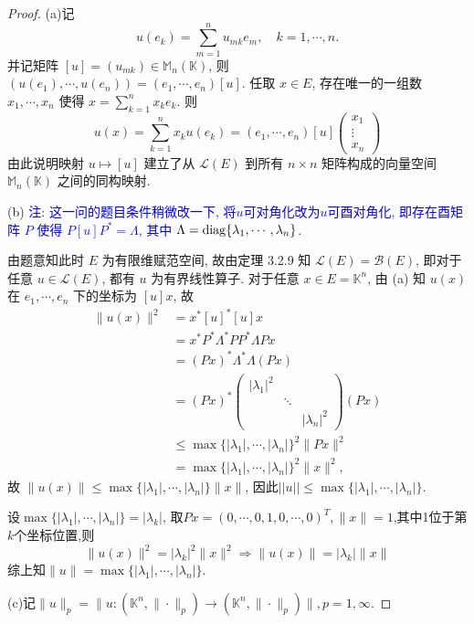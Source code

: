 \begin{proof}
(a)记
\[u(e_k)=\sum_{m=1}^n u_{mk}e_m,\quad k=1,\cdots,n.\]
并记矩阵 $[u]=(u_{mk})\in\mathbb{M}_n(\mathbb{K})$,
则 $(u(e_1),\cdots,u(e_n))=(e_1,\cdots,e_n)[u]$.
任取 $x\in E$, 存在唯一的一组数 $x_1,\cdots,x_n$ 使得 $x=\sum_{k=1}^n x_ke_k$. 则
\[u(x)=\sum_{k=1}^n x_ku(e_k)=(e_1,\cdots,e_n)[u]
\begin{pmatrix}
    x_1\\\vdots\\x_n
\end{pmatrix}\]
由此说明映射 $u\mapsto [u]$ 建立了从 $\mathcal{L}(E)$ 到所有 $n\times n$ 
矩阵构成的向量空间 $\mathbb{M}_n(\mathbb{K})$ 之间的同构映射.

(b) \textcolor{blue}{注: 这一问的题目条件稍微改一下, 将$u$可对角化改为$u$可酉对角化,
即存在酉矩阵 $P$ 使得 $P[u]P^{*}=\Lambda$, 其中 $\Lambda=\operatorname{diag}\{\lambda_1,\cdots,\lambda_n\}$.}

由题意知此时 $E$ 为有限维赋范空间, 故由定理 3.2.9 知 $\mathcal{L}(E)=\mathcal{B}(E)$,
即对于任意 $u\in\mathcal{L}(E)$, 都有 $u$ 为有界线性算子.
对于任意 $x\in E=\mathbb{K}^n$, 由 (a) 知 $u(x)$ 在 $e_1,\cdots,e_n$
下的坐标为 $[u]x$, 故
\begin{align*}
    \|u(x)\|^2
    & =x^{*}[u]^{*}[u]x\\
    & =x^{*}P^{*}\Lambda^{*}PP^{*}\Lambda Px\\
    & =(Px)^{*}\Lambda^{*}\Lambda(Px)\\
    & =(Px)^{*}\begin{pmatrix}|\lambda_1|^2& & \\ &\ddots& \\ & & |\lambda_n|^2\end{pmatrix}(Px)\\
    & \leq\max\{|\lambda_1|,\cdots,|\lambda_n|\}^2\|Px\|^2\\&=\max\{|\lambda_1|,\cdots,|\lambda_n|\}^2\|x\|^2,
\end{align*}
故 $\|u(x)\|\leq \max\{|\lambda_1|,\cdots,|\lambda_n|\}\|x\|$, 因此$||u||\leq \max\{|\lambda_1|,\cdots,|\lambda_n|\}$.

设$\max\{|\lambda_1|,\cdots,|\lambda_n|\}=|\lambda_k|$, 取$Px=(0,\cdots,0,1,0,\cdots,0)^T,\|x\|=1$,其中1位于第$k$个坐标位置,则
\[\|u(x)\|^2=|\lambda_k|^2\|x\|^2\Rightarrow \|u(x)\|=|\lambda_k|\|x\|\]
综上知$\|u\|=\max\{|\lambda_1|,\cdots,|\lambda_n|\}$.

(c)记$\|u\|_p=\|u:(\mathbb{K}^n,\|\cdot\|_p)\to(\mathbb{K}^n,\|\cdot\|_p)\|,p=1,\infty$.


\end{proof}
